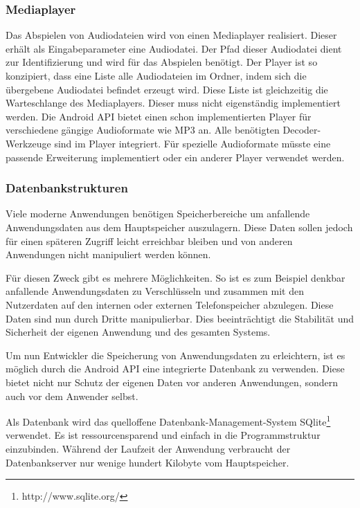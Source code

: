 \subsubsection{Mediaplayer}

Das Abspielen von Audiodateien wird von einen Mediaplayer realisiert. Dieser erhält als Eingabeparameter eine Audiodatei. Der Pfad dieser Audiodatei dient zur Identifizierung und wird für das Abspielen benötigt. Der Player ist so konzipiert, dass eine Liste alle Audiodateien im Ordner, indem sich die übergebene Audiodatei befindet erzeugt wird. Diese Liste ist gleichzeitig die Warteschlange des Mediaplayers. Dieser muss nicht eigenständig implementiert werden. Die Android API bietet einen schon implementierten Player für verschiedene gängige Audioformate wie MP3 an. Alle benötigten Decoder-Werkzeuge sind im Player integriert. Für spezielle Audioformate müsste eine passende Erweiterung implementiert oder ein anderer Player verwendet werden.

\subsubsection{Datenbankstrukturen}
\label{Datenbankstrukturen}

Viele moderne Anwendungen benötigen Speicherbereiche um anfallende Anwendungsdaten aus dem Hauptspeicher auszulagern. Diese Daten sollen jedoch für einen späteren Zugriff leicht erreichbar bleiben und von anderen Anwendungen nicht manipuliert werden können.

Für diesen Zweck gibt es mehrere Möglichkeiten. So ist es zum Beispiel denkbar anfallende Anwendungsdaten zu Verschlüsseln und zusammen mit den Nutzerdaten auf den internen oder externen Telefonspeicher abzulegen. Diese Daten sind nun durch Dritte manipulierbar. Dies beeinträchtigt die Stabilität und Sicherheit der eigenen Anwendung und des gesamten Systems.

Um nun Entwickler die Speicherung von Anwendungsdaten zu erleichtern, ist es möglich durch die Android API eine integrierte Datenbank zu verwenden. Diese bietet nicht nur Schutz der eigenen Daten vor anderen Anwendungen, sondern auch vor dem Anwender selbst.

Als Datenbank wird das quelloffene Datenbank-Management-System SQlite\footnote{http://www.sqlite.org/} verwendet. Es ist ressourcensparend und einfach in die Programmstruktur einzubinden. Während der Laufzeit der Anwendung verbraucht der Datenbankserver nur wenige hundert Kilobyte vom Hauptspeicher.

